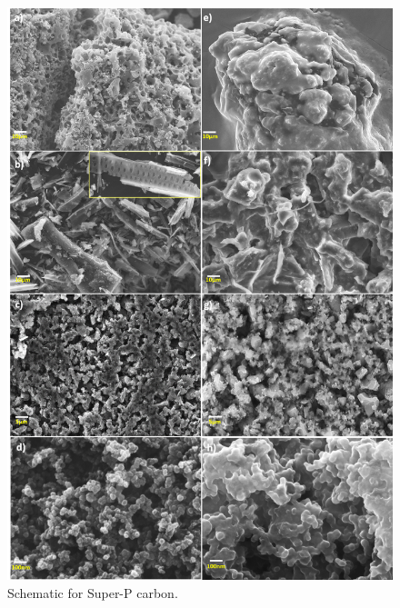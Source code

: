 \documentclass{article}
\begin{document}
\begin{figure}[h]
  \centering
  \includegraphics[width=\textwidth]{figures/SEM}
    \caption{Schematic for Super-P carbon.}
  \label{figures:fig1}
\end{figure}
\end{document}
